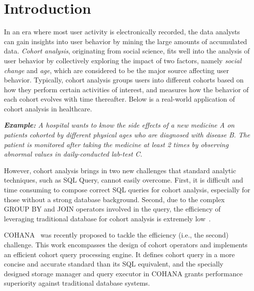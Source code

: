\section{Introduction}
\label{sec::intro}
%
In an era where most user activity is electronically recorded, the data analysts can gain insights into user behavior by mining the large amounts of accumulated data.
\emph{Cohort analysis}, originating from social science\cite{glenn2005cohort}, fits well into the analysis of user behavior by collectively exploring the impact of two factors, namely \emph{social change} and \emph{age}, which are considered to be the major source affecting user behavior. Typically, cohort analysis groups users into different cohorts based on how they perform certain activities of interest, and measures how the behavior of each cohort evolves with time thereafter. Below is a real-world application of cohort analysis in healthcare.

\emph{\textbf{Example:} A hospital wants to know the side effects of a new medicine A on patients cohorted by different physical ages who are diagnosed with disease B. The patient is monitored after taking the medicine at least 2 times by observing abnormal values in daily-conducted lab-test C.}


However, cohort analysis brings in two new challenges that standard analytic techniques, such as SQL Query, cannot easily overcome. First, it is difficult and time consuming to compose correct SQL queries for cohort analysis, especially for those without a strong database background. Second, due to the complex GROUP BY and JOIN operators involved in the query, the efficiency of leveraging traditional database for cohort analysis is extremely low~\cite{jiang2016cohort}. %

COHANA~\cite{jiang2016cohort} was recently proposed to tackle the efficiency (i.e., the second) challenge.
This work encompasses the design of cohort operators and implements an efficient cohort query processing engine. It defines cohort query in a more concise and accurate standard than its SQL equivalent, and the specially designed storage manager and query executor in COHANA grants performance superiority against traditional database systems. 

